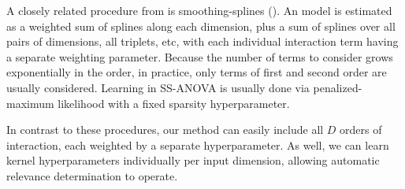 A closely related procedure from \citet{wahba1990spline} is smoothing-splines \ANOVA{} (\SSANOVA{}).
An \SSANOVA{} model is estimated as a weighted sum of splines along each dimension, plus a sum of splines over all pairs of dimensions, all triplets, etc, with each individual interaction term having a separate weighting parameter.
Because the number of terms to consider grows exponentially in the order, in practice, only terms of first and second order are usually considered.
Learning in SS-ANOVA is usually done via penalized-maximum likelihood with a fixed sparsity hyperparameter.


In contrast to these procedures, our method can easily include all $D$ orders of interaction, each weighted by a separate hyperparameter.
As well, we can learn kernel hyperparameters individually per input dimension, allowing automatic relevance determination to operate.



